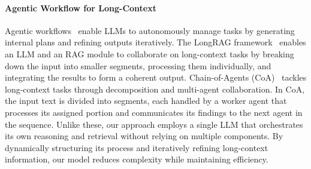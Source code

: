 

\paragraph{Agentic Workflow for Long-Context} 
Agentic workflows~\cite{yao2022react} enable LLMs to autonomously manage tasks by generating internal plans and refining outputs iteratively. 
The LongRAG framework~\cite{zhao-etal-2024-dual} enables an LLM and an RAG module to collaborate on long-context tasks by breaking down the input into smaller segments, processing them individually, and integrating the results to form a coherent output.
Chain-of-Agents (CoA)~\cite{zhang2024chain} tackles long-context tasks through decomposition and multi-agent collaboration. In CoA, the input text is divided into segments, each handled by a worker agent that processes its assigned portion and communicates its findings to the next agent in the sequence.
Unlike these, our approach employs a single LLM that orchestrates its own reasoning and retrieval without relying on multiple components. By dynamically structuring its process and iteratively refining long-context information, our model reduces complexity while maintaining efficiency.




